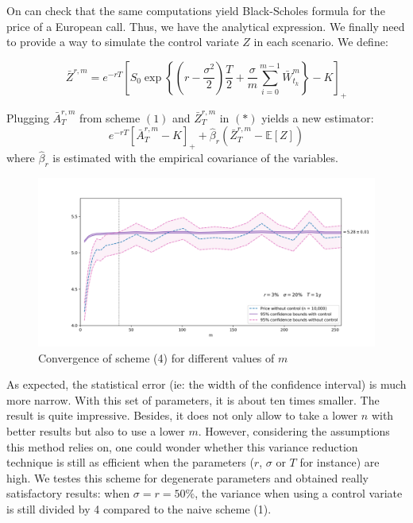 \documentclass{article}
\begin{document}
On can check that the same computations yield Black-Scholes formula for the price of a European call.
Thus, we have the analytical expression. We finally need to provide a way to simulate the control variate $Z$
in each scenario. We define:

\begin{equation}
	\bar Z^{r, m} = e^{-rT} \left[ S_0 \exp \left\{ \left( r - \frac{\sigma^2}{2} \right) \frac{T}{2} +
		\frac{\sigma}{m} \sum_{i=0}^{m-1} \bar W_{t_k}^m \right\} - K \right]_+
	\tag{$i$}
\end{equation}

Plugging $\bar A_T^{r, m}$ from scheme $(1)$ and $\bar Z_T^{r, m}$ in $(\ast)$ yields a new estimator:
\begin{equation}
	e^{-rT} \left[ \bar A_T^{r, m} - K \right]_+ + \hat\beta_r \left( \bar Z_T^{r, m} - \mathbb E [Z] \right)
	\tag{4}
\end{equation}
where $\hat\beta_r$ is estimated with the empirical covariance of the variables.

\begin{figure}[H]
  \hspace*{-0.1\linewidth}\includegraphics[width=1.1\textwidth]{charts/cvgce_control.png}
  \caption{Convergence of scheme (4) for different values of $m$}
\end{figure}

As expected, the statistical error (ie: the width of the confidence interval) is much more narrow. With this set of
parameters, it is about ten times smaller. The result is quite impressive. Besides, it does not only allow to take
a lower $n$ with better results but also to use a lower $m$. However, considering the assumptions this method relies on,
one could wonder whether this variance reduction technique is still as efficient when the parameters
($r$, $\sigma$ or $T$ for instance) are high. We testes this scheme for degenerate parameters and obtained really
satisfactory results: when $\sigma = r = 50\%$, the variance when using a control variate is still divided by 4
compared to the naive scheme (1).
\end{document}
